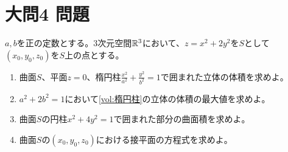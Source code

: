 \documentclass[dvipdfmx]{jsreport}
\begin{document}
\section{大問4 問題}
\begin{tcolorbox} %
	$a, b$を正の定数とする。3次元空間$\mathbb{R}^3$において、$z= x^2+ 2y^2$を$S$として$(x_0, y_0, z_0)$を$S$上の点とする。
\begin{enumerate}
	\item\label{vol:楕円柱} 曲面$S$、平面$z= 0$、楕円柱$\frac{x^2}{a^2}+ \frac{y^2}{b^2}= 1$で囲まれた立体の体積を求めよ。
	\item $a^2 +2b^2= 1$において\ref{vol:楕円柱}の立体の体積の最大値を求めよ。
	\item 曲面$S$の円柱$x^2+ 4y^2= 1$で囲まれた部分の曲面積を求めよ。
	\item 曲面$S$の$(x_0, y_0, z_0)$における接平面の方程式を求めよ。
\end{enumerate}
\end{tcolorbox}
\end{document}
